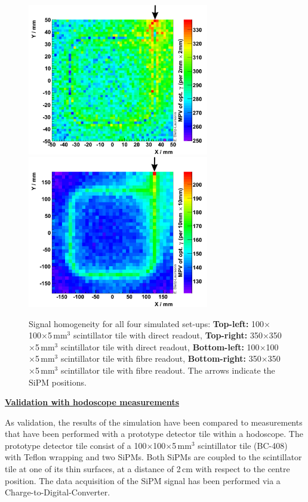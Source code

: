 \begin{figure}[h]
\vspace{0.5cm}
\includegraphics[width=7.9cm]{Figures/dietzlaursonn/411_100x5x100_Teflon__dataSim_opticalPhotons_on_SiPM_vs_hit_position.png}
\includegraphics[width=7.9cm]{Figures/dietzlaursonn/411_350x5x350_Teflon__dataSim_opticalPhotons_on_SiPM_vs_hit_position.png}
\caption{Signal homogeneity for all four simulated set-ups: \textbf{Top-left:} 100$\times$100$\times$5$\,$mm$^3$ scintillator tile with direct readout, \textbf{Top-right:} 350$\times$350$\times$5$\,$mm$^3$ scintillator tile with direct readout, \textbf{Bottom-left:} 100$\times$100$\times$5$\,$mm$^3$ scintillator tile with fibre readout, \textbf{Bottom-right:} 350$\times$350$\times$5$\,$mm$^3$ scintillator tile with fibre readout. The arrows indicate the SiPM positions.}
\label{fig:signalHomogeneity}
\end{figure}




\textbf{\underline{Validation with hodoscope measurements}}

As validation, the results of the simulation have been compared to measurements that have been performed with a prototype detector tile within a hodoscope. The prototype detector tile consist of  a 100$\times$100$\times$5$\,$mm$^3$ scintillator tile (BC-408) with Teflon wrapping and two SiPMs. Both SiPMs are coupled to the scintillator tile at one of its thin surfaces, at a distance of 2$\,$cm with respect to the centre position. The data acquisition of the SiPM signal has been performed via a Charge-to-Digital-Converter.

